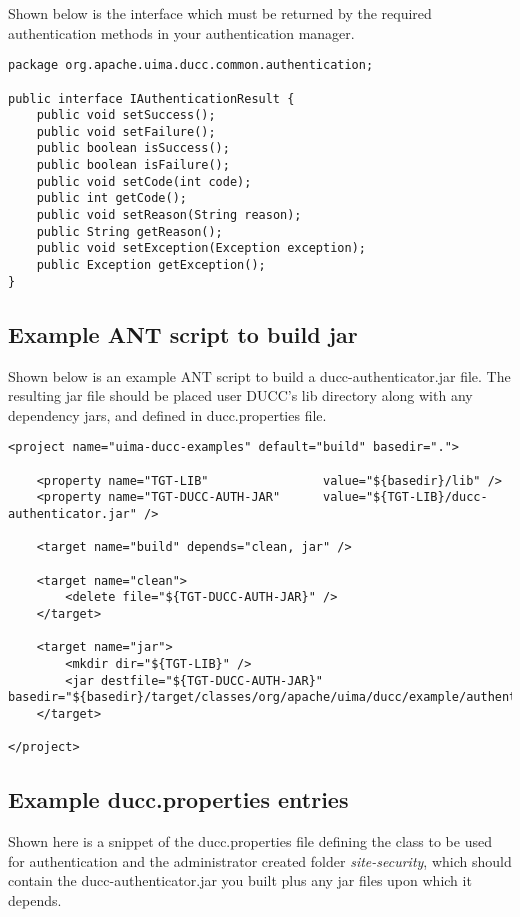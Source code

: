     Shown below is the interface which must be returned by the required
    authentication methods in your authentication manager.
    
    \begin{verbatim}
package org.apache.uima.ducc.common.authentication;
    
public interface IAuthenticationResult {
    public void setSuccess();
    public void setFailure();
    public boolean isSuccess();
    public boolean isFailure();
    public void setCode(int code);
    public int getCode();
    public void setReason(String reason);
    public String getReason();
    public void setException(Exception exception);
    public Exception getException();
}
    \end{verbatim}
    
\subsection{Example ANT script to build jar}
    
    Shown below is an example ANT script to build a ducc-authenticator.jar file.
    The resulting jar file should be placed user DUCC's lib directory along with
    any dependency jars, and defined in ducc.properties file.
    
    \begin{verbatim}
<project name="uima-ducc-examples" default="build" basedir=".">
    
    <property name="TGT-LIB"                value="${basedir}/lib" />
    <property name="TGT-DUCC-AUTH-JAR"      value="${TGT-LIB}/ducc-authenticator.jar" />
    
    <target name="build" depends="clean, jar" />
    
    <target name="clean">
        <delete file="${TGT-DUCC-AUTH-JAR}" />
    </target>
    
    <target name="jar">
        <mkdir dir="${TGT-LIB}" />
        <jar destfile="${TGT-DUCC-AUTH-JAR}" basedir="${basedir}/target/classes/org/apache/uima/ducc/example/authentication/module"/>
    </target>
    
</project>
    \end{verbatim}
    
\subsection{Example ducc.properties entries}
    
    Shown here is a snippet of the ducc.properties file defining the class to be
    used for authentication and the administrator created folder
    {\em site-security}, which should contain the ducc-authenticator.jar you
    built plus any jar files upon which it depends.
    
